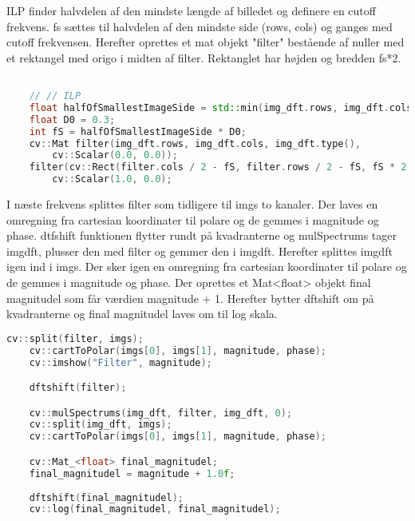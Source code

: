 \documentclass{article}
\begin{document}
ILP finder halvdelen af den mindste længde af billedet og definere en cutoff frekvens. fs sættes til halvdelen af den mindste side (rows, cols) og ganges med cutoff frekvensen. \newline 
Herefter oprettes et mat objekt "filter" bestående af nuller med et rektangel med origo i midten af filter. Rektanglet har højden og bredden fs*2. \newline 

\begin{lstlisting}[language=c++] 

    // // ILP 
    float halfOfSmallestImageSide = std::min(img_dft.rows, img_dft.cols) / 2.0; 
    float D0 = 0.3;  
    int fS = halfOfSmallestImageSide * D0; 
    cv::Mat filter(img_dft.rows, img_dft.cols, img_dft.type(), 
        cv::Scalar(0.0, 0.0)); 
    filter(cv::Rect(filter.cols / 2 - fS, filter.rows / 2 - fS, fS * 2.0, fS * 2.0)) = 
        cv::Scalar(1.0, 0.0); 
\end{lstlisting} 

 I næste frekvens splittes filter som tidligere til imgs to kanaler. Der laves en omregning fra cartesian koordinater til polare og de gemmes i magnitude og phase. dtfshift funktionen flytter rundt på kvadranterne og mulSpectrums tager imgdft, plusser den med filter og gemmer den i imgdft.\newline 
Herefter splittes imgdft igen ind i imgs. Der sker igen en omregning fra cartesian koordinater til polare og de gemmes i magnitude og phase. \newline 
Der oprettes et Mat<float> objekt final magnitudel som får værdien magnitude + 1. Herefter bytter dftshift om på kvadranterne og final magnitudel laves om til log skala. \newline 

\begin{lstlisting}[language=c++] 
    cv::split(filter, imgs); 
    cv::cartToPolar(imgs[0], imgs[1], magnitude, phase); 
    cv::imshow("Filter", magnitude); 

    dftshift(filter); 

    cv::mulSpectrums(img_dft, filter, img_dft, 0); 
    cv::split(img_dft, imgs); 
    cv::cartToPolar(imgs[0], imgs[1], magnitude, phase); 

    cv::Mat_<float> final_magnitudel; 
    final_magnitudel = magnitude + 1.0f; 
    
    dftshift(final_magnitudel); 
    cv::log(final_magnitudel, final_magnitudel); 
\end{lstlisting} 
\end{document}
